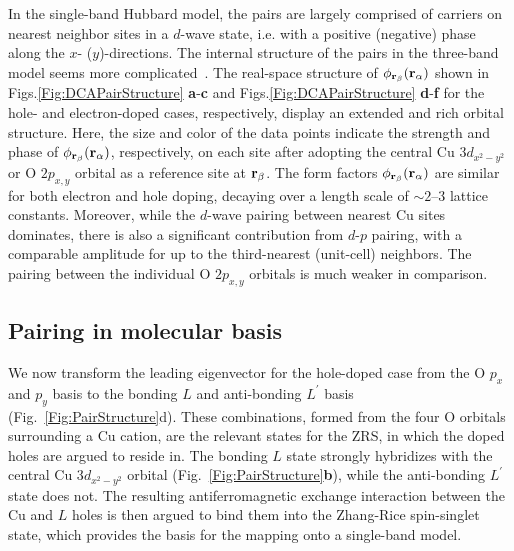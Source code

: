 \documentclass[fleqn,twocolumn,11pt]{wlscirep}
\begin{document}
In the single-band Hubbard model, the pairs are largely comprised of carriers on nearest neighbor sites in a $d$-wave state, i.e. with a positive (negative) phase along the $x$- ($y$)-directions. The internal structure of the pairs in the three-band model seems more complicated~\cite{Moreo}. The real-space structure of $\phi_{{\bf r}_\beta}({\bf r}_\alpha)$ shown in Figs.\ref{Fig:DCAPairStructure} {\bf a}-{\bf c} and Figs.\ref{Fig:DCAPairStructure} {\bf d}-{\bf f} for the hole- and electron-doped cases, respectively, display an extended and rich orbital structure. Here, the size and color of the data points indicate the strength and phase of $\phi_{{\bf r}_\beta}({\bf r}_\alpha)$, respectively, on each site after adopting the central Cu $3d_{x^2-y^2}$ or O $2p_{x,y}$ orbital as a reference site at ${\bf r}_\beta$. The form factors $\phi_{{\bf r}_\beta}({\bf r}_\alpha)$ are similar for both electron and hole doping, decaying over a length scale of $\sim 2$--$3$ lattice constants. Moreover, while the $d$-wave pairing between nearest Cu sites dominates, there is also a significant contribution from $d$-$p$ pairing, with a comparable amplitude for up to the third-nearest (unit-cell) neighbors. The pairing between the individual O $2p_{x,y}$ orbitals is much weaker in comparison. 


\subsection*{Pairing in molecular basis}
We now transform the leading eigenvector for the hole-doped case from the O $p_x$ and $p_y$ basis to the bonding $L$ and anti-bonding $L^\prime$ basis (Fig.~\ref{Fig:PairStructure}d). These combinations, formed from the four O orbitals surrounding a Cu cation, are the relevant states for the ZRS, in which the doped holes are argued to reside in. The bonding $L$ state strongly hybridizes with the central Cu 3$d_{x^2-y^2}$ orbital (Fig.~\ref{Fig:PairStructure}{\bf  b}), while the anti-bonding $L^\prime$ state does not. The resulting antiferromagnetic exchange interaction between the Cu and $L$ holes is then argued to bind them into the Zhang-Rice spin-singlet state, which provides the basis for the mapping onto a single-band model.
\end{document}
